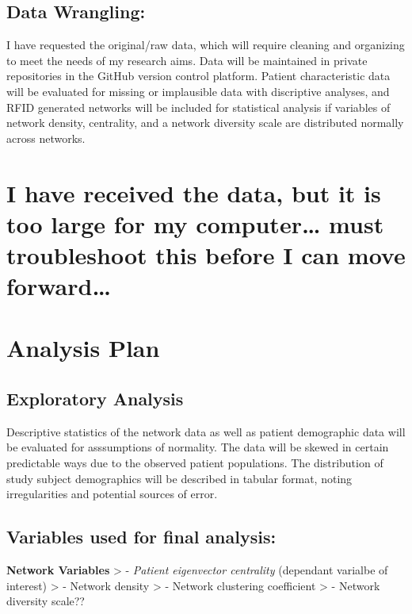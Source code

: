 \documentclass[]{elsarticle} %
\begin{document}
\subsection{Data Wrangling:}\label{data-wrangling}

I have requested the original/raw data, which will require cleaning and
organizing to meet the needs of my research aims. Data will be
maintained in private repositories in the GitHub version control
platform. Patient characteristic data will be evaluated for missing or
implausible data with discriptive analyses, and RFID generated networks
will be included for statistical analysis if variables of network
density, centrality, and a network diversity scale are distributed
normally across networks.

\section{I have received the data, but it is too large for my
computer\ldots{} must troubleshoot this before I can move
forward\ldots{}}\label{i-have-received-the-data-but-it-is-too-large-for-my-computer-must-troubleshoot-this-before-i-can-move-forward}

\section{Analysis Plan}\label{analysis-plan}

\subsection{Exploratory Analysis}\label{exploratory-analysis}

Descriptive statistics of the network data as well as patient
demographic data will be evaluated for asssumptions of normality. The
data will be skewed in certain predictable ways due to the observed
patient populations. The distribution of study subject demographics will
be described in tabular format, noting irregularities and potential
sources of error.

\subsection{Variables used for final
analysis:}\label{variables-used-for-final-analysis}

\textbf{Network Variables} \textgreater{} - \emph{Patient eigenvector
centrality} (dependant varialbe of interest) \textgreater{} - Network
density \textgreater{} - Network clustering coefficient \textgreater{} -
Network diversity scale??
\end{document}
